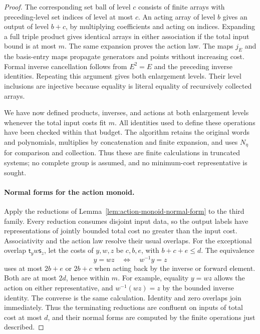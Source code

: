 \begin{proof}
The corresponding set ball of level $c$ consists of finite
arrays with preceding-level set indices of level at most
$c$.  An acting array of level $b$ gives an output of level
$b+c$, by multiplying coefficients and acting on indices.
Expanding a full triple product gives identical arrays in
either association if the total input bound is at most $m$.
The same expansion proves the action law.  The maps $j_E$
and the basis-entry maps propagate generators and points
without increasing cost.  Formal inverse cancellation
follows from $E^2=E$ and the preceding inverse identities.
Repeating this argument gives both enlargement levels.
Their level inclusions are injective because equality is
literal equality of recursively collected arrays.

We have now defined products, inverses, and actions at both
enlargement levels whenever the total input costs fit $m$.
All identities used to define these operations have been checked
within that budget.  The algorithm retains the original words and
polynomials, multiplies by concatenation and finite expansion, and
uses $N_\eta$ for comparison and collection.  Thus these are finite
calculations in truncated systems; no complete group is assumed,
and no minimum-cost representative is sought.

\paragraph{Normal forms for the action monoid.}
Apply the reductions of
Lemma~\ref{lem:action-monoid-normal-form} to the third
family.  Every reduction consumes disjoint input data,
so the output labels have representations of jointly
bounded total cost no greater than the input cost.
Associativity and the action law resolve their usual
overlaps.  For the exceptional overlap
$\mathsf t_y w\mathsf s_z$, let the costs of $y,w,z$
be $c,b,e$, with $b+c+e\leq d$.  The equivalence
\begin{equation}\label{eq:bounded-inverse-action}
 y=wz\quad\Longleftrightarrow\quad w^{-1}y=z
\end{equation}
uses at most $2b+e$ or $2b+c$ when acting back by the
inverse or forward element.  Both are at most $2d$,
hence within $m$.  For example, equality $y=wz$
allows the action on either representative, and
$w^{-1}(wz)=z$ by the bounded inverse identity.
The converse is the same calculation.  Identity
and zero overlaps join immediately.  Thus the
terminating reductions are confluent on inputs
of total cost at most $d$, and their normal forms
are computed by the finite operations just described.


\end{proof}
